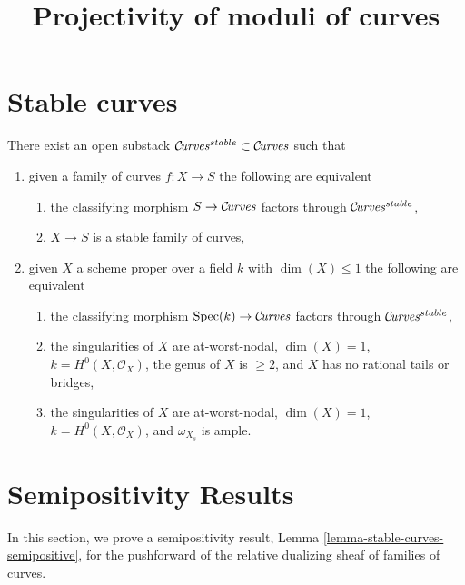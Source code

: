 

\newcommand{\todo}[1]{\footnote{\textbf{TODO.} #1}}

\title{Projectivity of moduli of curves}
\maketitle

\section{Stable curves}
\begin{lemma}
\label{lemma-stable-curves}
There exist an open substack $\mathcal{C}\!{\it urves}^{stable} \subset \mathcal{C}\!{\it urves}$
such that
\begin{enumerate}
\item given a family of curves $f : X \to S$ the following are equivalent
\begin{enumerate}
\item the classifying morphism $S \to \mathcal{C}\!{\it urves}$ factors
through $\mathcal{C}\!{\it urves}^{stable}$,
\item $X \to S$ is a stable family of curves,
\end{enumerate}
\item given $X$ a scheme proper over a field $k$ with
$\dim(X) \leq 1$ the following are equivalent
\begin{enumerate}
\item the classifying morphism $\mathop{\rm Spec}(k) \to \mathcal{C}\!{\it urves}$
factors through $\mathcal{C}\!{\it urves}^{stable}$,
\item the singularities of $X$ are at-worst-nodal, $\dim(X) = 1$,
$k = H^0(X, \mathcal{O}_X)$, the genus of $X$ is $\geq 2$, and
$X$ has no rational tails or bridges,
\item the singularities of $X$ are at-worst-nodal, $\dim(X) = 1$,
$k = H^0(X, \mathcal{O}_X)$, and $\omega_{X_s}$ is ample.
\end{enumerate}
\end{enumerate}
\end{lemma}

\section{Semipositivity Results}
In this section, we prove a semipositivity result,
Lemma \ref{lemma-stable-curves-semipositive}, for the pushforward of the
relative dualizing sheaf of families of curves.

